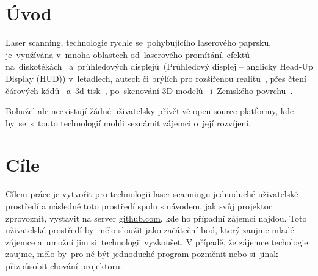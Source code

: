 \chapter*{Úvod}


Laser scanning, technologie rychle se~pohybujícího laserového paprsku, je~využívána v~mnoha oblastech od~laserového promítání, efektů na~diskotékách~\cite{laser-projection} a~průhledových displejů~(Průhledový displej -- anglicky Head-Up Display (HUD)) v~letadlech, autech či brýlích pro rozšířenou realitu~\cite{laser-huds}, přes čtení čárových kódů~\cite{history-of-barcode-scanning} a~3d tisk~\cite{Photo-curing-3D-printing}, po~skenování 3D modelů~\cite{3d-model-scan} i~Zemského povrchu~\cite{heightmaps}.

Bohužel ale neexistují žádné uživatelsky přívětivé open-source platformy, kde by~se~s~touto technologií mohli seznámit zájemci o~její rozvíjení.

\chapter{Cíle}
Cílem práce je vytvořit pro technologii laser scanningu jednoduché uživatelské prostředí a následně toto prostředí spolu s návodem, jak svůj projektor zprovoznit, vystavit na server \url{github.com}, kde ho případní zájemci najdou.
Toto uživatelské prostředí by~mělo sloužit jako začáteční bod, který zaujme mladé zájemce a~umožní jim si~technologii vyzkoušet.
V případě, že zájemce techologie zaujme, mělo by~pro ně být jednoduché program pozměnit nebo si~jinak přizpůsobit chování projektoru.
